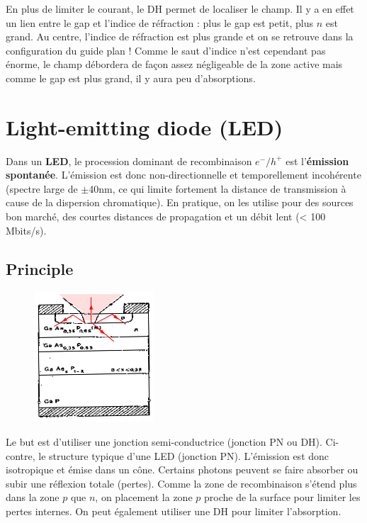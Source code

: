 En plus de limiter le courant, le DH permet de localiser le champ. Il y a en effet un lien entre
le gap et l'indice de réfraction : plus le gap est petit, plus $n$ est grand. Au centre, l'indice de
réfraction est plus grande et on se retrouve dans la configuration du guide plan ! Comme le saut 
d'indice n'est cependant pas énorme, le champ débordera de façon assez négligeable de la zone active
mais comme le gap est plus grand, il y aura peu d'absorptions.


\section{Light-emitting diode (LED)}
Dans un \textbf{LED}, le procession dominant de recombinaison $e^-/h^+$ est l'\textbf{émission 
spontanée}. L'émission est donc non-directionnelle et temporellement incohérente (spectre large
de $\pm$40nm, ce qui limite fortement la distance de transmission à cause de la dispersion 
chromatique). En pratique, on les utilise pour des sources bon marché, des courtes distances de
propagation et un débit lent (< 100 Mbits/s).

\subsection{Principle}
	\begin{figure}
	\vspace{-5mm}
	\includegraphics[scale=0.65]{ch4/image7}
	\end{figure}
Le but est d'utiliser une jonction semi-conductrice (jonction PN ou DH). Ci-contre, le structure 
typique d'une LED (jonction PN). L'émission est donc isotropique et émise dans un cône. Certains
photons peuvent se faire absorber ou subir une réflexion totale (pertes). Comme la zone de 
recombinaison s'étend plus dans la zone $p$ que $n$, on placement la zone $p$ proche de la surface 
pour limiter les pertes internes. On peut également utiliser une DH pour limiter l'absorption.\\

